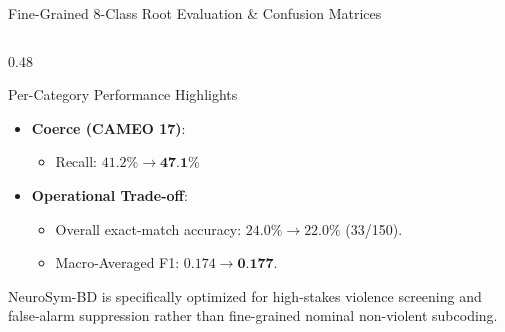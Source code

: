 \documentclass[aspectratio=169, 10pt]{beamer}
\begin{document}
\begin{frame}{Fine-Grained 8-Class Root Evaluation \& Confusion Matrices}
\begin{columns}[T]
\begin{column}{0.48\textwidth}
\begin{block}{Per-Category Performance Highlights}
\begin{itemize}
\begin{itemize}
              \item F1 Score: $0.578 \to \textbf{0.700}$ (\textbf{+12.2\% abs})
            \end{itemize}
          \item \textbf{Coerce (CAMEO 17)}:
            \begin{itemize}
              \item Recall: $41.2\% \to \textbf{47.1\%}$
            \end{itemize}
          \item \textbf{Operational Trade-off}:
            \begin{itemize}
              \item Overall exact-match accuracy: $24.0\% \to 22.0\%$ (33/150).
              \item Macro-Averaged F1: $0.174 \to \textbf{0.177}$.
            \end{itemize}
        \end{itemize}
        \footnotesize
        NeuroSym-BD is specifically optimized for high-stakes violence screening and false-alarm suppression rather than fine-grained nominal non-violent subcoding.
      \end{block}
    \end{column}
  \end{columns}
\end{frame}
\end{document}
